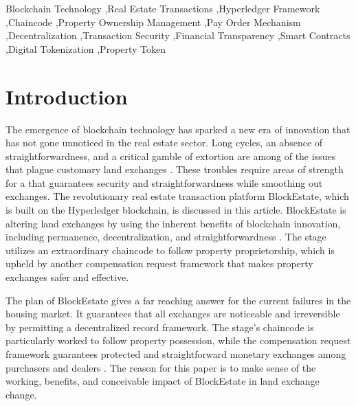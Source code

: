 \documentclass[3p,times]{elsarticle}
\begin{document}
\begin{frontmatter}
\begin{abstract}
\end{abstract}

\begin{keyword}
Blockchain Technology \sep Real Estate Transactions \sep Hyperledger Framework \sep Chaincode \sep Property Ownership Management \sep Pay Order Mechanism \sep Decentralization \sep Transaction Security \sep Financial Transparency \sep Smart Contracts \sep Digital Tokenization \sep Property Token
\end{keyword}

\end{frontmatter}


\section{Introduction}

The emergence of blockchain technology has sparked a new era of innovation that has not gone unnoticed in the real estate sector. Long cycles, an absence of straightforwardness, and a critical gamble of extortion are among of the issues that plague customary land exchanges \cite{saari2022blockchain}. These troubles require areas of strength for a that guarantees security and straightforwardness while smoothing out exchanges. The revolutionary real estate transaction platform BlockEstate, which is built on the Hyperledger blockchain, is discussed in this article. BlockEstate is altering land exchanges by using the inherent benefits of blockchain innovation, including permanence, decentralization, and straightforwardness \cite{garcia2020legal}. The stage utilizes an extraordinary chaincode to follow property proprietorship, which is upheld by another compensation request framework that makes property exchanges safer and effective.

The plan of BlockEstate gives a far reaching answer for the current failures in the housing market. It guarantees that all exchanges are noticeable and irreversible by permitting a decentralized record framework. The stage's chaincode is particularly worked to follow property possession, while the compensation request framework guarantees protected and straightforward monetary exchanges among purchasers and dealers \cite{ullah2023conceptual}. The reason for this paper is to make sense of the working, benefits, and conceivable impact of BlockEstate in land exchange change.
\end{document}
